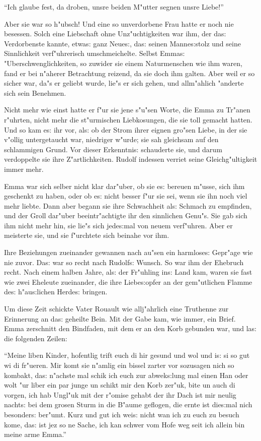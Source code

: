 \documentclass[oneside,12pt]{book}
\newcommand{\s}{s:}%
\begin{document}
"`Ich glaube fest, da droben, unsre beiden M"utter segnen unsre
Liebe!"'

Aber sie war so h"ubsch! Und eine so unverdorbene Frau hatte er
noch nie besessen. Solch eine Liebschaft ohne Unz"uchtigkeiten war
ihm, der da{\s} Verdorbenste kannte, etwa{\s} ganz Neue{\s},
da{\s} seinen Manne{\s}stolz und seine Sinnlichkeit verf"uhrerisch
umschmeichelte. Selbst Emma{\s} "Uberschwenglichkeiten, so zuwider
sie einem Naturmenschen wie ihm waren, fand er bei n"aherer
Betrachtung reizend, da sie doch ihm galten. Aber weil er so
sicher war, da"s er geliebt wurde, lie"s er sich gehen, und
allm"ahlich "anderte sich sein Benehmen.

Nicht mehr wie einst hatte er f"ur sie jene s"u"sen Worte, die
Emma zu Tr"anen r"uhrten, nicht mehr die st"urmischen
Liebkosungen, die sie toll gemacht hatten. Und so kam e{\s} ihr
vor, al{\s} ob der Strom ihrer eignen gro"sen Liebe, in der sie
v"ollig untergetaucht war, niedriger w"urde; sie sah gleichsam auf
den schlammigen Grund. Vor dieser Erkenntni{\s} schauderte sie,
und darum verdoppelte sie ihre Z"artlichkeiten. Rudolf indessen
verriet seine Gleichg"ultigkeit immer mehr.

Emma war sich selber nicht klar dar"uber, ob sie e{\s} bereuen
m"usse, sich ihm geschenkt zu haben, oder ob e{\s} nicht besser
f"ur sie sei, wenn sie ihn noch viel mehr liebte. Dann aber begann
sie ihre Schwachheit al{\s} Schmach zu empfinden, und der Groll
dar"uber beeintr"achtigte ihr den sinnlichen Genu"s. Sie gab sich
ihm nicht mehr hin, sie lie"s sich jede{\s}mal von neuem
verf"uhren. Aber er meisterte sie, und sie f"urchtete sich beinahe
vor ihm.

Ihre Beziehungen zueinander gewannen nach au"sen ein harmlose{\s}
Gepr"age wie nie zuvor. Da{\s} war so recht nach Rudolf{\s}
Wunsch. So war ihm der Ehebruch recht. Nach einem halben Jahre,
al{\s} der Fr"uhling in{\s} Land kam, waren sie fast wie zwei
Eheleute zueinander, die ihre Liebe{\s}opfer an der gem"utlichen
Flamme de{\s} h"au{\s}lichen Herde{\s} bringen.

Um diese Zeit schickte Vater Rouault wie allj"ahrlich eine
Truthenne zur Erinnerung an da{\s} geheilte Bein. Mit der Gabe
kam, wie immer, ein Brief. Emma zerschnitt den Bindfaden, mit dem
er an den Korb gebunden war, und la{\s} die folgenden Zeilen:

"`Meine liben Kinder, hofentlig trift euch di hir gesund und wol
und i{\s} si so gut wi di fr"ueren. Mir komt sie n"amlig ein
bissel zarter vor sozusagen nich so kombakt, da{\s} n"achste mal
schik ich euch zur abwek{\s}lung mal einen Han oder wolt "ur liber
ein par junge un schikt mir den Korb zer"uk, bite un auch di
vorgen, ich hab Ungl"uk mit der r"omise gehabt der ihr Dach ist
mir neulig nacht{\s} bei dem grosen Sturm in die B"aume geflogen,
die ernte ist die{\s}mal nich besonder{\s} ber"umt. Kurz und gut
ich wei{\s} nicht wan ich zu euch zu besuch kome, da{\s} ist jez
so ne Sache, ich kan schwer vom Hofe weg seit ich allein bin meine
arme Emma."'
\end{document}
